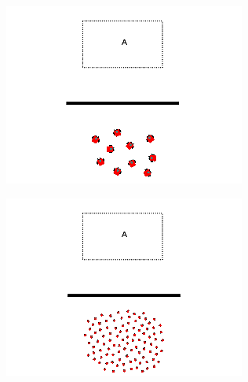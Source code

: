 \begin{figure}
\begin{subfigure}{0.4\textwidth}
	\end{subfigure}
	\begin{subfigure}{0.4\textwidth}
		\includegraphics[width=\linewidth]{../ui_experiment/slide_images/Swarm_Robot_Control_-_10_Robot_0005.png}
	\end{subfigure}
	\begin{subfigure}{0.4\textwidth}
		\includegraphics[width=\linewidth]{../ui_experiment/slide_images/Swarm_Robot_Control_-_100_Robot_0005.png}
	\end{subfigure}
	\begin{subfigure}{0.4\textwidth}

\end{subfigure}
\end{figure}
